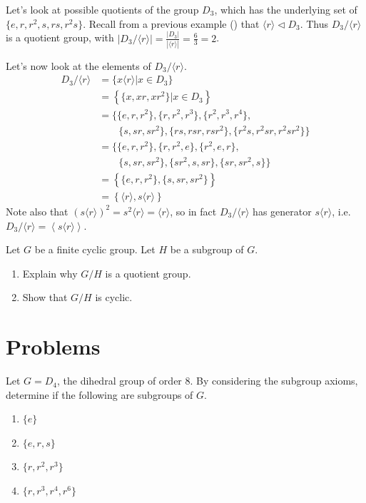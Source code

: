\begin{example}
    Let's look at possible quotients of the group $D_3$, which has the underlying set of $\{e, r, r^2, s, rs, r^2s\}$. Recall from a previous example () that $\langle r \rangle \lhd D_3$. Thus $D_3 / \langle r \rangle$ is a quotient group, with $|D_3 / \langle r \rangle| = \frac{|D_3|}{|\langle r\rangle|} = \frac63 = 2$.

    Let's now look at the elements of $D_3 / \langle r \rangle$.
    \begin{align*}
        D_3 / \langle r \rangle  &= \{x\langle r \rangle \vert x \in D_3\}\\
        &= \left\{\{x, xr, xr^2\} \vert x \in D_3\right\}\\
        &= \{\{e, r, r^2\}, \{r, r^2, r^3\}, \{r^2, r^3, r^4\}, \\ &\quad\quad \{s, sr, sr^2\}, \{rs, rsr, rsr^2\}, \{r^2s, r^2sr, r^2sr^2\}\}\\
        &= \{\{e, r, r^2\}, \{r, r^2, e\}, \{r^2, e, r\}, \\ &\quad\quad \{s, sr, sr^2\}, \{sr^2, s, sr\}, \{sr, sr^2, s\}\}\\
        &= \left\{\{e, r, r^2\}, \{s, sr, sr^2\}\right\}\\
        &= \left\{\langle r\rangle, s\langle r \rangle\right\}
    \end{align*}
    Note also that $(s\langle r \rangle)^2 = s^2\langle r \rangle = \langle r\rangle$, so in fact $D_3 / \langle r \rangle$ has generator $s\langle r \rangle$, i.e. $D_3 / \langle r \rangle = \left\langle s\langle r \rangle \right\rangle$.
\end{example}

\begin{exercise}\label{exercise-quotient-group-of-cyclic-group-is-cyclic}
    Let $G$ be a finite cyclic group. Let $H$ be a subgroup of $G$.
    \begin{enumerate}[label=(\roman*)]
        \item Explain why $G/H$ is a quotient group.
        \item Show that $G/H$ is cyclic.
    \end{enumerate}    
\end{exercise}

\newpage

\section{Problems}
\begin{problem}
    Let $G = D_4$, the dihedral group of order 8. By considering the subgroup axioms, determine if the following are subgroups of $G$.
    \begin{enumerate}[label=(\alph*)]
        \item $\{e\}$
        \item $\{e, r, s\}$
        \item $\{r, r^2, r^3\}$
        \item $\{r, r^3, r^4, r^6\}$
    \end{enumerate}
\end{problem}

